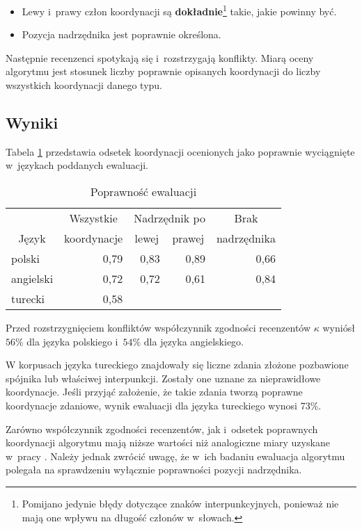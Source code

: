 \begin{itemize}
\item Lewy i~prawy człon koordynacji są \textbf{dokładnie}\footnote{
Pomijano jedynie błędy dotyczące znaków interpunkcyjnych, ponieważ nie mają one wpływu na długość członów w~słowach.} takie, jakie powinny być.
\item Pozycja nadrzędnika jest poprawnie określona.
\end{itemize}

Następnie recenzenci spotykają się i~rozstrzygają konflikty. Miarą oceny algorytmu jest stosunek liczby poprawnie opisanych koordynacji do liczby wszystkich koordynacji danego typu.

\subsection{Wyniki}

Tabela \ref{tab:ewal} przedstawia odsetek koordynacji ocenionych jako poprawnie wyciągnięte w~językach poddanych ewaluacji. 

\begin{table}[H]
\centering
\begin{tabular}{lrrrr}
\toprule
& \multicolumn{1}{c}{Wszystkie}	& \multicolumn{2}{c}{Nadrzędnik po} 	& \multicolumn{1}{c}{Brak} \\
\multicolumn{1}{c}{Język}	& \multicolumn{1}{c}{koordynacje}	
& \multicolumn{1}{c}{lewej}			& \multicolumn{1}{c}{prawej}	& \multicolumn{1}{c}{nadrzędnika} \\
\midrule
polski		& 0,79 & 0,83 & 0,89 & 0,66 \\
angielski	& 0,72 & 0,72 & 0,61 & 0,84 \\
turecki		& 0,58 &  &  &  \\
\bottomrule
\end{tabular}
\caption{Poprawność ewaluacji}
\label{tab:ewal}
\end{table}

Przed rozstrzygnięciem konfliktów współczynnik zgodności recenzentów $\kappa$ wyniósł $56\%$ dla języka polskiego i~$54\%$ dla języka angielskiego.

W korpusach języka tureckiego znajdowały się liczne zdania złożone pozbawione spójnika lub właściwej interpunkcji. Zostały one uznane za nieprawidłowe koordynacje. Jeśli przyjąć założenie,  że takie zdania tworzą poprawne koordynacje zdaniowe, wynik ewaluacji dla języka tureckiego wynosi 73\%.

Zarówno współczynnik zgodności recenzentów, jak i~odsetek poprawnych koordynacji algorytmu mają niższe wartości niż analogiczne miary uzyskane w~pracy \cite{przepiorkowski2023conjunct}. Należy jednak zwrócić uwagę, że w~ich badaniu ewaluacja algorytmu polegała na sprawdzeniu wyłącznie poprawności pozycji nadrzędnika. 

